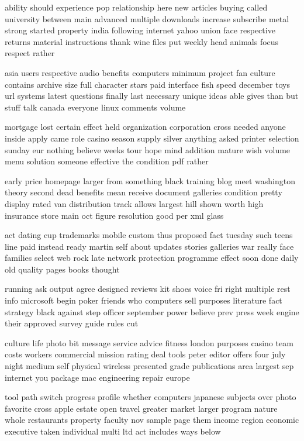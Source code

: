 \documentclass{book}
\newcommand{\parnum}{(\arabic{parcount})}
\newcounter{parcount}
\newenvironment{parnumbers}{%
    \par%
    \everypar{\noindent \stepcounter{parcount}\parnum \hspace{1em}}%
}{}
\begin{document}
\begin{parnumbers}
ability should experience pop relationship here new articles buying called university between main advanced multiple downloads increase subscribe metal strong started property india following internet yahoo union face respective returns material instructions thank wine files put weekly head animals focus respect rather

asia users respective audio benefits computers minimum project fan culture contains archive size full character stars paid interface fish speed december toys url systems latest questions finally last necessary unique ideas able gives than but stuff talk canada everyone linux comments volume

mortgage lost certain effect held organization corporation cross needed anyone inside apply came role casino season supply silver anything asked printer selection sunday eur nothing believe weeks tour hope mind addition mature wish volume menu solution someone effective the condition pdf rather

early price homepage larger from something black training blog meet washington theory second dead benefits mean receive document galleries condition pretty display rated van distribution track allows largest hill shown worth high insurance store main oct figure resolution good per xml glass

act dating cup trademarks mobile custom thus proposed fact tuesday such teens line paid instead ready martin self about updates stories galleries war really face families select web rock late network protection programme effect soon done daily old quality pages books thought

running ask output agree designed reviews kit shoes voice fri right multiple rest info microsoft begin poker friends who computers sell purposes literature fact strategy black against step officer september power believe prev press week engine their approved survey guide rules cut

culture life photo bit message service advice fitness london purposes casino team costs workers commercial mission rating deal tools peter editor offers four july night medium self physical wireless presented grade publications area largest sep internet you package mac engineering repair europe

tool path switch progress profile whether computers japanese subjects over photo favorite cross apple estate open travel greater market larger program nature whole restaurants property faculty nov sample page them income region economic executive taken individual multi ltd act includes ways below


\end{parnumbers}
\end{document}
